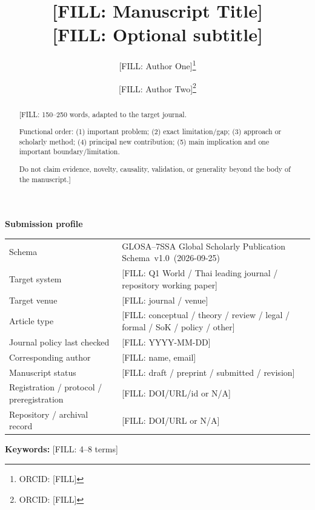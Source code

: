 \documentclass[11pt]{article}
\title{\textbf{[FILL: Manuscript Title]}\\[0.35em]
\large [FILL: Optional subtitle]}
\author[1]{[FILL: Author One]\thanks{ORCID: [FILL]}}
\author[2]{[FILL: Author Two]\thanks{ORCID: [FILL]}}
\affil[1]{[FILL: Affiliation or ``Independent Researcher''] }
\affil[2]{[FILL: Affiliation]}
\date{}
\newcommand{\SchemaName}{GLOSA--7SSA Global Scholarly Publication Schema}
\newcommand{\SchemaVersion}{1.0}
\newcommand{\SchemaDate}{2026-09-25}
\newcommand{\TargetVenue}{[FILL: journal / venue]}
\newcommand{\ArticleType}{[FILL: conceptual / theory / review / legal / formal / SoK / policy / other]}
\newcommand{\TargetSystem}{[FILL: Q1 World / Thai leading journal / repository working paper]}
\newcommand{\PolicyCheckedDate}{[FILL: YYYY-MM-DD]}
\newenvironment{schemaBox}[1]
  {\begin{center}\begin{minipage}{0.96\linewidth}\small
   \noindent\textbf{#1}\par\medskip}
  {\end{minipage}\end{center}}
\begin{document}
\maketitle

\begin{schemaBox}{Submission profile}
\begin{tabularx}{\linewidth}{@{}lX@{}}
\toprule
Schema & \SchemaName\ v\SchemaVersion\ (\SchemaDate)\\
Target system & \TargetSystem\\
Target venue & \TargetVenue\\
Article type & \ArticleType\\
Journal policy last checked & \PolicyCheckedDate\\
Corresponding author & [FILL: name, email]\\
Manuscript status & [FILL: draft / preprint / submitted / revision]\\
Registration / protocol / preregistration & [FILL: DOI/URL/id or N/A]\\
Repository / archival record & [FILL: DOI/URL or N/A]\\
\bottomrule
\end{tabularx}
\end{schemaBox}

\begin{abstract}
[FILL: 150--250 words, adapted to the target journal.

Functional order:
(1) important problem;
(2) exact limitation/gap;
(3) approach or scholarly method;
(4) principal new contribution;
(5) main implication and one important boundary/limitation.

Do not claim evidence, novelty, causality, validation, or generality beyond the
body of the manuscript.]
\end{abstract}

\noindent\textbf{Keywords:} [FILL: 4--8 terms]


\end{document}
